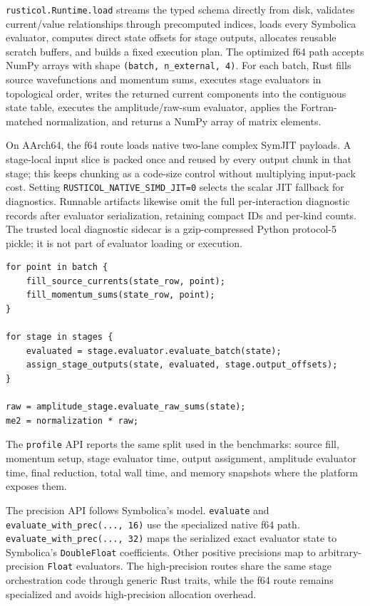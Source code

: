 \documentclass[10pt]{article}
\begin{document}
\texttt{rusticol.Runtime.load} streams the typed schema directly from disk,
validates current/value relationships through precomputed indices, loads every
Symbolica evaluator, computes direct state offsets for stage outputs, allocates
reusable scratch buffers, and builds a fixed execution plan.  The optimized f64
path accepts NumPy arrays with shape
\texttt{(batch, n\_external, 4)}.  For each batch, Rust fills source
wavefunctions and momentum sums, executes stage evaluators in topological order,
writes the returned current components into the contiguous state table, executes
the amplitude/raw-sum evaluator, applies the Fortran-matched normalization, and
returns a NumPy array of matrix elements.

On AArch64, the f64 route loads native two-lane complex SymJIT payloads.  A
stage-local input slice is packed once and reused by every output chunk in that
stage; this keeps chunking as a code-size control without multiplying input-pack
cost.  Setting \texttt{RUSTICOL\_NATIVE\_SIMD\_JIT=0} selects the scalar JIT
fallback for diagnostics.
Runnable artifacts likewise omit the full per-interaction diagnostic records
after evaluator serialization, retaining compact IDs and per-kind counts.  The
trusted local diagnostic sidecar is a gzip-compressed Python protocol-5 pickle;
it is not part of evaluator loading or execution.
\begin{lstlisting}
for point in batch {
    fill_source_currents(state_row, point);
    fill_momentum_sums(state_row, point);
}

for stage in stages {
    evaluated = stage.evaluator.evaluate_batch(state);
    assign_stage_outputs(state, evaluated, stage.output_offsets);
}

raw = amplitude_stage.evaluate_raw_sums(state);
me2 = normalization * raw;
\end{lstlisting}
The \texttt{profile} API reports the same split used in the benchmarks: source
fill, momentum setup, stage evaluator time, output assignment, amplitude
evaluator time, final reduction, total wall time, and memory snapshots where the
platform exposes them.

The precision API follows Symbolica's model.  \texttt{evaluate} and
\texttt{evaluate\_with\_prec(..., 16)} use the specialized native f64 path.
\texttt{evaluate\_with\_prec(..., 32)} maps the serialized exact evaluator state
to Symbolica's \texttt{DoubleFloat} coefficients.  Other positive precisions map
to arbitrary-precision \texttt{Float} evaluators.  The high-precision routes
share the same stage orchestration code through generic Rust traits, while the
f64 route remains specialized and avoids high-precision allocation overhead.
\end{document}
